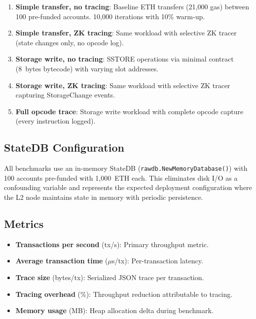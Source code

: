 \begin{enumerate}
  \item \textbf{Simple transfer, no tracing}: Baseline ETH transfers (21{,}000 gas)
    between 100 pre-funded accounts. 10{,}000 iterations with 10\% warm-up.
  \item \textbf{Simple transfer, ZK tracing}: Same workload with selective ZK
    tracer (state changes only, no opcode log).
  \item \textbf{Storage write, no tracing}: SSTORE operations via minimal
    contract (8~bytes bytecode) with varying slot addresses.
  \item \textbf{Storage write, ZK tracing}: Same workload with selective ZK
    tracer capturing StorageChange events.
  \item \textbf{Full opcode trace}: Storage write workload with complete opcode
    capture (every instruction logged).
\end{enumerate}

\subsection{StateDB Configuration}

All benchmarks use an in-memory StateDB (\texttt{rawdb.NewMemoryDatabase()})
with 100 accounts pre-funded with 1{,}000~ETH each. This eliminates disk I/O
as a confounding variable and represents the expected deployment configuration
where the L2 node maintains state in memory with periodic persistence.

\subsection{Metrics}

\begin{itemize}
  \item \textbf{Transactions per second} (tx/s): Primary throughput metric.
  \item \textbf{Average transaction time} ($\mu$s/tx): Per-transaction latency.
  \item \textbf{Trace size} (bytes/tx): Serialized JSON trace per transaction.
  \item \textbf{Tracing overhead} (\%): Throughput reduction attributable to tracing.
  \item \textbf{Memory usage} (MB): Heap allocation delta during benchmark.
\end{itemize}
